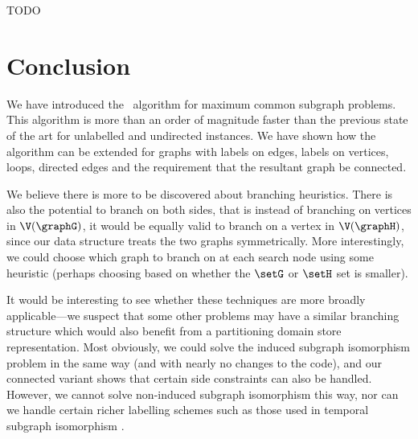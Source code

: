 TODO

\section{Conclusion}

We have introduced the \McSplit\ algorithm for maximum common subgraph
problems.  This algorithm is more than an order of magnitude faster than the
previous state of the art for unlabelled and undirected instances. We have
shown how the algorithm can be extended for graphs with labels on edges, labels
on vertices, loops, directed edges and the requirement that the resultant graph
be connected.

We believe there is more to be discovered about branching heuristics. There is
also the potential to branch on both sides, that is instead of branching on
vertices in $\V(\graphG)$, it would be equally valid to branch on a vertex in
$\V(\graphH)$, since our data structure treats the two graphs symmetrically. More
interestingly, we could choose which graph to branch on at each search node
using some heuristic (perhaps choosing based on whether the $\setG$ or $\setH$ set is
smaller).

It would be interesting to see whether these techniques are more broadly
applicable---we suspect that some other problems may have a similar branching
structure which would also benefit from a partitioning domain store
representation. Most obviously, we could solve the induced subgraph isomorphism
problem in the same way (and with nearly no changes to the code), and our
connected variant shows that certain side constraints can also be handled.
However, we cannot solve non-induced subgraph isomorphism this way, nor can
we handle certain richer labelling schemes such as those used in temporal
subgraph isomorphism \citep{DBLP:conf/asunam/RedmondC13}.
